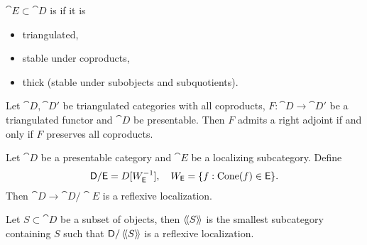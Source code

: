 \begin{definition}
$\cat{E}\subset \cat{D}$ is  if it is
\begin{itemize}
\item triangulated,
\item stable under coproducts,
\item thick (stable under subobjects and subquotients).
\end{itemize}
\end{definition}

\begin{theorem}
Let $\cat{D},\cat{D}'$ be triangulated categories with all coproducts, $F:\cat{D}\to
\cat{D}'$ be a triangulated functor and $\cat{D}$ be presentable. Then $F$ admits a right
adjoint if and only if $F$ preserves all coproducts.
\end{theorem}

\begin{corollary}
Let $\cat{D}$ be a presentable category and $\cat{E}$ be a localizing subcategory. Define
\[
\mathsf{D} / \mathsf{E} = D[W_{\mathsf{E}}^{-1}],\quad W_{\mathsf{E}} = \{f:\operatorname{Cone}(f)\in \mathsf{E}\}
.\]
Then $\cat{D} \to \cat{D} /\cat{E}$ is a reflexive localization.
\end{corollary}
Let $S\subset \cat{D}$ be a subset of objects, then $\left\langle\!\left\langle S \right\rangle\!\right\rangle$ is the smallest subcategory
containing $S$ such that $\mathsf{D} /\left\langle\!\left\langle S \right\rangle\!\right\rangle$ is a reflexive localization.

